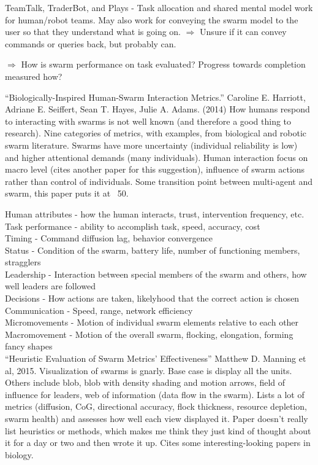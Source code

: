 \documentclass[]{article}
\begin{document}
TeamTalk, TraderBot, and Plays - Task allocation and shared mental model work for human/robot teams. May also work for conveying the swarm model to the user so that they understand what is going on. $\Rightarrow$ Unsure if it can convey commands or queries back, but probably can. 

$\Rightarrow$ How is swarm performance on task evaluated? Progress towards completion measured how?

``Biologically-Inspired Human-Swarm Interaction Metrics.'' \cite{harriott2014biologically} Caroline E. Harriott, Adriane E. Seiffert, Sean T. Hayes, Julie A. Adams. (2014) How humans respond to interacting with swarms is not well known (and therefore a good thing to research). Nine categories of metrics, with examples, from biological and robotic swarm literature. Swarms have more uncertainty (individual reliability is low) and higher attentional demands (many individuals). Human interaction focus on macro level (cites another paper for this suggestion), influence of swarm actions rather than control of individuals. Some transition point between multi-agent and swarm, this paper puts it at ~50. 

Human attributes - how the human interacts, trust, intervention frequency, etc. \\
Task performance - ability to accomplish task, speed, accuracy, cost \\
Timing - Command diffusion lag, behavior convergence \\
Status - Condition of the swarm, battery life, number of functioning members, stragglers \\
Leadership - Interaction between special members of the swarm and others, how well leaders are followed \\
Decisions - How actions are taken, likelyhood that the correct action is chosen \\
Communication - Speed, range, network efficiency \\
Micromovements - Motion of individual swarm elements relative to each other \\
Macromovement - Motion of the overall swarm, flocking, elongation, forming fancy shapes \\

``Heuristic Evaluation of Swarm Metrics’ Effectiveness'' \cite{manning2015heuristic} Matthew D. Manning et al, 2015. Visualization of swarms is gnarly. Base case is display all the units. Others include blob, blob with density shading and motion arrows, field of influence for leaders, web of information (data flow in the swarm). Lists a lot of metrics (diffusion, CoG, directional accuracy, flock thickness, resource depletion, swarm health) and assesses how well each view displayed it. Paper doesn't really list heuristics or methods, which makes me think they just kind of thought about it for a day or two and then wrote it up. Cites some interesting-looking papers in biology. 
\end{document}
